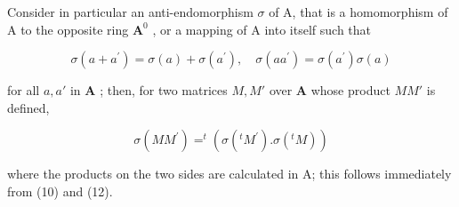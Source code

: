 Consider in particular an anti-endomorphism \(\sigma\) of A, that is a homomorphism of A to the opposite ring \(\mathbf{A}^0\) , or a mapping of A into itself such that

\[
\sigma (a + a ^ {\prime}) = \sigma (a) + \sigma (a ^ {\prime}), \quad \sigma (a a ^ {\prime}) = \sigma (a ^ {\prime}) \sigma (a)
\]

for all \(a, a'\) in \(\mathbf{A}\) ; then, for two matrices \(M, M'\) over \(\mathbf{A}\) whose product \(MM'\) is defined,

\[
\sigma (M M ^ {\prime}) = ^ {t} (\sigma (^ {t} M ^ {\prime}). \sigma (^ {t} M))\tag{13}
\]

where the products on the two sides are calculated in A; this follows immediately from (10) and (12).

